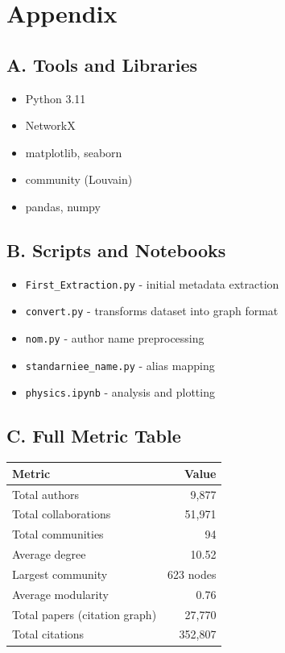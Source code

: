 \documentclass[12pt]{article}
\begin{document}
\newpage

\section*{Appendix}
\subsection*{A. Tools and Libraries}
\begin{itemize}
\item Python 3.11
\item NetworkX
\item matplotlib, seaborn
\item community (Louvain)
\item pandas, numpy
\end{itemize}

\subsection*{B. Scripts and Notebooks}
\begin{itemize}
\item \texttt{First\_Extraction.py} - initial metadata extraction
\item \texttt{convert.py} - transforms dataset into graph format
\item \texttt{nom.py} - author name preprocessing
\item \texttt{standarniee\_name.py} - alias mapping
\item \texttt{physics.ipynb} - analysis and plotting
\end{itemize}

\subsection*{C. Full Metric Table}
\begin{center}
    \begin{tabular}{|l|r|}
    \hline
    \textbf{Metric} & \textbf{Value} \\
    \hline
    Total authors & 9,877 \\
    Total collaborations & 51,971 \\
    Total communities & 94 \\
    Average degree & 10.52 \\
    Largest community & 623 nodes \\
    Average modularity & 0.76 \\
    Total papers (citation graph) & 27,770 \\
    Total citations & 352,807 \\
    \hline
    \end{tabular}
\end{center}
\end{document}
